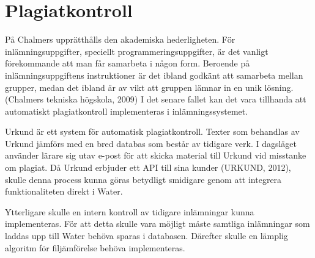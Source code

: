 \section{Plagiatkontroll}
På Chalmers upprätthålls den akademiska hederligheten. För inlämningsuppgifter, speciellt programmeringsuppgifter, är det vanligt förekommande att man får samarbeta i någon form. Beroende på inlämningsuppgiftens instruktioner är det ibland godkänt att samarbeta mellan grupper, medan det ibland är av vikt att gruppen lämnar in en unik lösning. (Chalmers tekniska högskola, 2009) I det senare fallet kan det vara tillhanda att automatiskt plagiatkontroll implementeras i inlämningssystemet.

Urkund är ett system för automatisk plagiatkontroll. Texter som behandlas av Urkund jämförs med en bred databas som består av tidigare verk. I dagsläget använder lärare sig utav e-post för att skicka material till Urkund vid misstanke om plagiat. Då Urkund erbjuder ett API till sina kunder (URKUND, 2012), skulle denna process kunna göras betydligt smidigare genom att integrera funktionaliteten direkt i Water.

Ytterligare skulle en intern kontroll av tidigare inlämningar kunna implementeras. För att detta skulle vara möjligt måste samtliga inlämningar som laddas upp till Water behöva sparas i databasen. Därefter skulle en lämplig algoritm för filjämförelse behöva implementeras.
